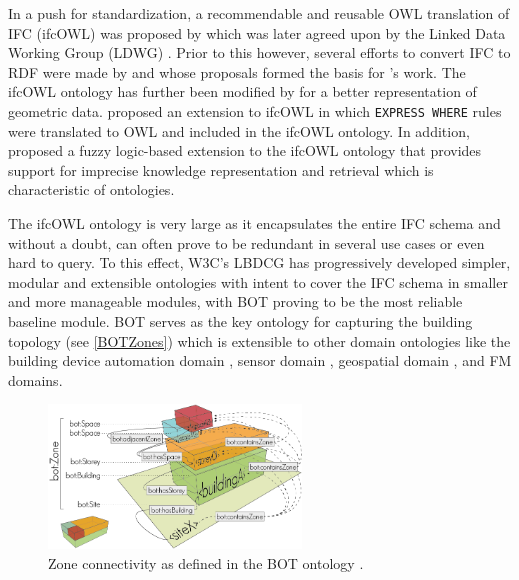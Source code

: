 In a push for standardization, a recommendable and reusable \ac{OWL} translation of \ac{IFC} (ifcOWL) was proposed by \cite{Pauwels2016} which was later agreed upon by the Linked Data Working Group (LDWG) \citep{W3C2014}. Prior to this however, several efforts to convert \ac{IFC} to \ac{RDF} were made by \cite{Agostinho2007, Beetz2005, Krima2009, Pauwels2015a, Schevers2005} and \cite{Zhao2008} whose proposals formed the basis for \cite{Pauwels2016}'s work. The ifcOWL ontology has further been modified by \cite{Pauwels2017} for a better representation of geometric data.  \cite{Terkaj2015} proposed an extension to ifcOWL in which \texttt{EXPRESS WHERE} rules were translated to OWL and included in the ifcOWL ontology. In addition, \cite{Gomez-Romero2015} proposed a fuzzy logic-based extension to the ifcOWL ontology that provides support for imprecise knowledge representation and retrieval which is characteristic of ontologies. 

The ifcOWL ontology is very large as it encapsulates the entire IFC schema and without a doubt, can often prove to be redundant in several use cases or even hard to query. To this effect, W3C's \ac{LBDCG} \citep{W3C2014} has progressively developed simpler, modular and extensible ontologies with intent to cover the IFC schema in smaller and more manageable modules, with \ac{BOT} \citep{Rasmussen2017a, Rasmussen2017, Rasmussen2019} proving to be the most reliable baseline module. \ac{BOT} serves as the key ontology for capturing the building topology (see \autoref{BOTZones}) which is extensible to other domain ontologies like the building device automation domain \citep{Bonino2018, Schneider2017, Villalon2017}, sensor domain \citep{Haller2017}, geospatial domain \citep{McGlinn2017}, and \ac{FM} domains.

\begin{figure}[t]
	\centering
	\includegraphics[width=0.6\textwidth]{figures/zones.png}
	\caption{Zone connectivity as defined in the \ac{BOT} ontology \citep{Rasmussen2017}.} 
	\label{BOTZones}
\end{figure}

